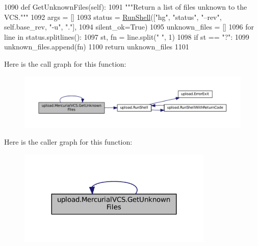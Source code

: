 \begin{DoxyCode}
1090   \textcolor{keyword}{def }GetUnknownFiles(self):
1091     \textcolor{stringliteral}{"""Return a list of files unknown to the VCS."""}
1092     args = []
1093     status = \hyperlink{namespaceupload_adddc423c49132e8879cbb25d6be2cf11}{RunShell}([\textcolor{stringliteral}{"hg"}, \textcolor{stringliteral}{"status"}, \textcolor{stringliteral}{"--rev"}, self.base\_rev, \textcolor{stringliteral}{"-u"}, \textcolor{stringliteral}{"."}],
1094         silent\_ok=\textcolor{keyword}{True})
1095     unknown\_files = []
1096     \textcolor{keywordflow}{for} line \textcolor{keywordflow}{in} status.splitlines():
1097       st, fn = line.split(\textcolor{stringliteral}{" "}, 1)
1098       \textcolor{keywordflow}{if} st == \textcolor{stringliteral}{"?"}:
1099         unknown\_files.append(fn)
1100     \textcolor{keywordflow}{return} unknown\_files
1101 
\end{DoxyCode}
Here is the call graph for this function\+:
\nopagebreak
\begin{figure}[H]
\begin{center}
\leavevmode
\includegraphics[width=350pt]{classupload_1_1MercurialVCS_a6190899fb86cd09ad84cc5d4b0ebd2f3_cgraph}
\end{center}
\end{figure}
Here is the caller graph for this function\+:
\nopagebreak
\begin{figure}[H]
\begin{center}
\leavevmode
\includegraphics[width=263pt]{classupload_1_1MercurialVCS_a6190899fb86cd09ad84cc5d4b0ebd2f3_icgraph}
\end{center}
\end{figure}
\mbox{\label{classupload_1_1MercurialVCS_a6190899fb86cd09ad84cc5d4b0ebd2f3}} 
